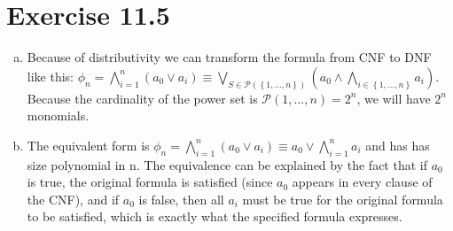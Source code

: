 \documentclass{article} %
\newcommand{\homeworkNumber}{11}
\begin{document}
\section*{Exercise \homeworkNumber.5}
\begin{enumerate}[(a)]
	\item Because of distributivity we can transform the formula from CNF to DNF like this: \( \phi_n = \bigwedge\limits_{i=1}^{n}(a_{0} \lor a_i) \equiv \bigvee\limits_{S \in \mathcal{P}(\left\{ 1, \ldots ,n \right\} )}(a_{0} \land \bigwedge\limits_{i \in \left\{ 1, \ldots ,n \right\} } a_{i})\). Because the cardinality of the power set is \( \mathcal{P}({1,\ldots ,n}) = 2^n \), we will have \( 2^n \) monomials.
	\item The equivalent form is \( \phi_n = \bigwedge\limits_{i=1}^{n}(a_{0} \lor a_i) \equiv a_{0} \lor \bigwedge\limits_{i=1}^{n}a_{i}\) and has has size polynomial in n. The equivalence can be explained by the fact that if \( a_{0} \) is true, the original formula is satisfied (since \( a_{0} \) appears in every clause of the CNF), and if \( a_{0} \) is false, then all \( a_i \) must be true for the original formula to be satisfied, which is exactly what the specified formula expresses.

\end{enumerate}
\end{document}
